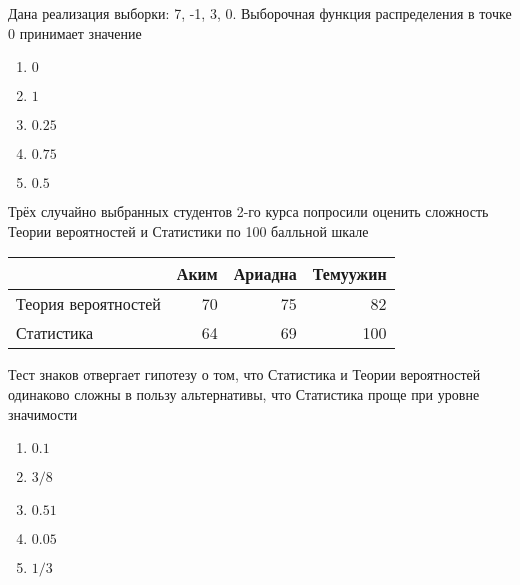 \documentclass[t]{beamer}
\begin{document}
 \begin{frame} \label{45} 
\begin{block}{45} 

Дана реализация выборки: 7, -1, 3, 0.  Выборочная функция распределения в точке 0 принимает значение


 \end{block} 
\begin{enumerate} 
\item[] \hyperlink{45-No}{\beamergotobutton{} $0$}
\item[] \hyperlink{45-No}{\beamergotobutton{} $1$}
\item[] \hyperlink{45-No}{\beamergotobutton{} $0.25$}
\item[] \hyperlink{45-No}{\beamergotobutton{} $0.75$}
\item[] \hyperlink{45-Yes}{\beamergotobutton{} $0.5$}
\end{enumerate} 
\end{frame} 


 \begin{frame} \label{46} 
\begin{block}{46} 

Трёх случайно выбранных студентов 2-го курса попросили оценить сложность Теории вероятностей и Статистики по 100 балльной шкале

\vspace{5mm}
\begin{tabular}{lrrr}
  \toprule
   & Аким & Ариадна & Темуужин \\
   \midrule
   Теория вероятностей & 70 & 75 & 82 \\
   Статистика & 64 & 69 & 100 \\
  \bottomrule
\end{tabular}
\vspace{5mm}


Тест знаков отвергает гипотезу о том, что Статистика и Теории вероятностей одинаково сложны в пользу альтернативы, что Статистика проще при уровне значимости


 \end{block} 
\begin{enumerate} 
\item[] \hyperlink{46-No}{\beamergotobutton{} $0.1$}
\item[] \hyperlink{46-No}{\beamergotobutton{} $3/8$}
\item[] \hyperlink{46-Yes}{\beamergotobutton{} $0.51$}
\item[] \hyperlink{46-No}{\beamergotobutton{} $0.05$}
\item[] \hyperlink{46-No}{\beamergotobutton{} $1/3$}
\end{enumerate} 
\end{frame} 
\end{document}
